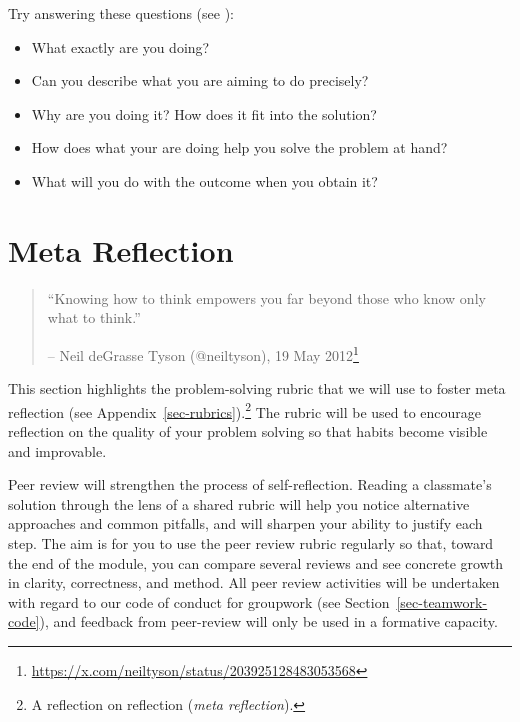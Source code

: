\documentclass[
  a4paper,
  DIV=11,
  numbers=noendperiod,
  oneside]{scrreprt}
\providecommand{\tightlist}{%
  \setlength{\itemsep}{0pt}\setlength{\parskip}{0pt}}
\begin{document}
\begin{tcolorbox}[enhanced jigsaw, colframe=quarto-callout-important-color-frame, title=\textcolor{quarto-callout-important-color}{\faExclamation}\hspace{0.5em}{Still stuck?}, breakable, opacityback=0, titlerule=0mm, colbacktitle=quarto-callout-important-color!10!white, toptitle=1mm, colback=white, coltitle=black, toprule=.15mm, bottomtitle=1mm, left=2mm, arc=.35mm, rightrule=.15mm, bottomrule=.15mm, opacitybacktitle=0.6, leftrule=.75mm]

Try answering these questions (see
):

\begin{itemize}
\tightlist
\item
  What exactly are you doing?
\item
  Can you describe what you are aiming to do precisely?
\item
  Why are you doing it? How does it fit into the solution?
\item
  How does what your are doing help you solve the problem at hand?
\item
  What will you do with the outcome when you obtain it?
\end{itemize}

\end{tcolorbox}

\chapter{Meta Reflection}\label{sec-meta-reflection}

\begin{quote}
``Knowing how to think empowers you far beyond those who know only what
to think.''

-- Neil deGrasse Tyson (@neiltyson), 19 May 2012\footnote{\url{https://x.com/neiltyson/status/203925128483053568}}
\end{quote}

This section highlights the problem-solving rubric that we will use to
foster meta reflection (see Appendix~\ref{sec-rubrics}).\footnote{A
  reflection on reflection (\emph{meta reflection}).} The rubric will be
used to encourage reflection on the quality of your problem solving so
that habits become visible and improvable.

Peer review will strengthen the process of self-reflection. Reading a
classmate's solution through the lens of a shared rubric will help you
notice alternative approaches and common pitfalls, and will sharpen your
ability to justify each step. The aim is for you to use the peer review
rubric regularly so that, toward the end of the module, you can compare
several reviews and see concrete growth in clarity, correctness, and
method. All peer review activities will be undertaken with regard to our
code of conduct for groupwork (see Section~\ref{sec-teamwork-code}), and
feedback from peer-review will only be used in a formative capacity.
\end{document}
